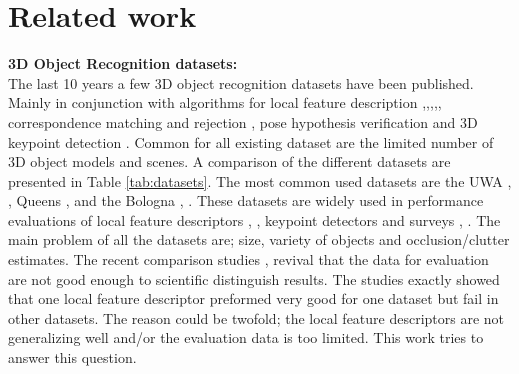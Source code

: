 \documentclass[10pt,twocolumn,letterpaper]{article}
\begin{document}
\section{Related work} \label{sec:related_work}
\textbf{3D Object Recognition datasets:}\\
The last 10 years a few 3D object recognition datasets have been published. Mainly in conjunction with algorithms for local feature description \cite{Mian2006},\cite{Taati2007},\cite{Taati2011},\cite{Tombari2010},\cite{Salti2014}, correspondence matching and rejection \cite{Rodola2013}, pose hypothesis verification \cite{Aldoma2012} and 3D keypoint detection \cite{Mian2010}. Common for all existing dataset are the limited number of 3D object models and scenes. A comparison of the different datasets are presented in Table \ref{tab:datasets}. The most common used datasets are the UWA  \cite{Mian2006}, \cite{Mian2010}, Queens \cite{Taati2007},\cite{Taati2011} and the Bologna \cite{Salti2014}, \cite{Tombari2010}. These datasets are widely used in performance evaluations of  local feature descriptors \cite{Guo2015}, \cite{Buch2016}, keypoint detectors \cite{Salti2011} and surveys \cite{Guo2014}, \cite{FilipeAlexandre2014}. The main problem of all the datasets are; size, variety of objects and occlusion/clutter estimates. The recent comparison studies \cite{Guo2015}, \cite{Buch2016} revival that the data for evaluation are not good enough to scientific distinguish results. The studies exactly showed that one local feature descriptor preformed very good for one dataset but fail in other datasets. The reason could be twofold; the local feature descriptors are not generalizing well and/or the evaluation data is too limited. This work tries to answer this question.\\ 
\end{document}
